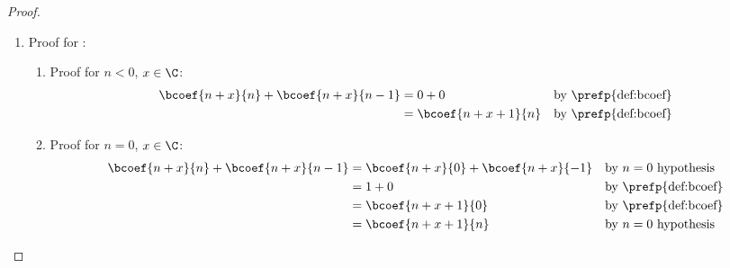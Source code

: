\begin{proof}
\begin{enumerate}
\begin{enumerate}
      \item Proof for $n,k\in\Z,\,n\ge 0 > k$: 
        \begin{align*}
          \bcoef{n}{k} 
            &= \frac{\mfall{n}{k}}{k!}
            && \forall n,k\in\Z,\,k > n \ge 0
            && \text{by \prefp{def:bcoef}}
          \\&= \frac{n(n-1)(n-2)\cdots0\cdots(n-k+1)}{(n-k)!}
            && \forall n,k\in\Z,\,k > n \ge 0
            && \text{by \prefp{def:mfall}}
          \\&= 0
          \\&= \bcoef{n}{n-k}
            && \forall n,k\in\Z,\,k > n \ge 0
            && \text{by \prefp{def:bcoef}}
        \end{align*}
    \end{enumerate}

  \item Proof for : \label{item:bcoef_pascalrule}
    \begin{enumerate}
      \item Proof for $n<0$, $x\in\C$:
        \begin{align*}
          \bcoef{n+x}{n} + \bcoef{n+x}{n-1}
            &= 0 + 0
            && \text{by \prefp{def:bcoef}}
          \\&= \bcoef{n+x+1}{n}
            && \text{by \prefp{def:bcoef}}
        \end{align*}

      \item Proof for $n=0$, $x\in\C$:
        \begin{align*}
          \bcoef{n+x}{n} + \bcoef{n+x}{n-1}
            &= \bcoef{n+x}{0} + \bcoef{n+x}{-1}
            && \text{by $n=0$ hypothesis}
          \\&= 1 + 0
            && \text{by \prefp{def:bcoef}}
          \\&= \bcoef{n+x+1}{0}
            && \text{by \prefp{def:bcoef}}
          \\&= \bcoef{n+x+1}{n}
            && \text{by $n=0$ hypothesis}
        \end{align*}


\end{enumerate}
\end{enumerate}
\end{proof}
